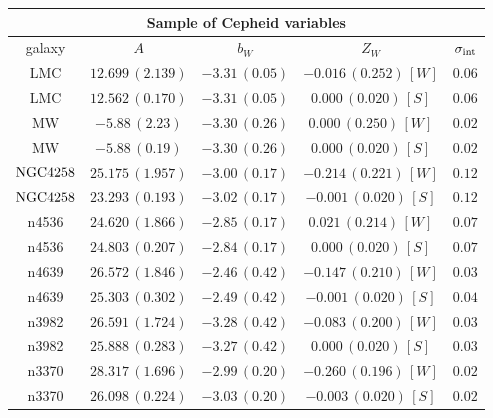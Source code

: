 \begin{table}[tbp]
\centering
\begin{tabular}{@{}ccccc}
\hline
\multicolumn{5}{c}{Sample of Cepheid variables} \\
\hline
galaxy & $A$ & $b_W$ & $Z_W$ & $\sigma_{\mathrm{int}}$ \\
\hline
 LMC & $12.699\,(2.139)$ & $-3.31\,(0.05)$ & $-0.016\,(0.252)\,[W]$ & $0.06$ \\

LMC & $12.562\,(0.170)$ & $-3.31\,(0.05)$ & $0.000\,(0.020)\,[S]$ & $0.06$ \\
  
 MW & $-5.88\,(2.23)$ & $-3.30\,(0.26)$ & $0.000\,(0.250)\,[W]$ & $0.02$ \\

 MW & $-5.88\,(0.19)$ & $-3.30\,(0.26)$ & $0.000\,(0.020)\,[S]$ & $0.02$ \\
 
 $\mathrm{NGC4258}$ & $25.175\,(1.957)$ & $-3.00\,(0.17)$ & $-0.214\,(0.221)\,[W]$& $0.12$ \\

 $\mathrm{NGC4258}$ & $23.293\,(0.193)$ & $-3.02\,(0.17)$ & $-0.001\,(0.020)\,[S]$& $0.12$ \\
 
 n4536 & $24.620\,(1.866)$ & $-2.85\,(0.17)$ & $ 0.021\,(0.214)\,[W]$ & $0.07$ \\

 n4536 & $24.803\,(0.207)$ & $-2.84\,(0.17)$ & $ 0.000\,(0.020)\,[S]$ & $0.07$ \\
 
 n4639 & $26.572\,(1.846)$ & $-2.46\,(0.42)$ & $-0.147\,(0.210)\,[W]$ & $0.03$ \\
 
 n4639 & $25.303\,(0.302)$ & $-2.49\,(0.42)$ & $-0.001\,(0.020)\,[S]$ & $0.04$ \\
  
 n3982 & $26.591\,(1.724)$ & $-3.28\,(0.42)$ & $-0.083\,(0.200)\,[W]$ & $0.03$ \\
  
 n3982 & $25.888\,(0.283)$ & $-3.27\,(0.42)$ & $ 0.000\,(0.020)\,[S]$ & $0.03$ \\
   
 n3370 & $28.317\,(1.696)$ & $-2.99\,(0.20)$ & $-0.260\,(0.196)\,[W]$ & $0.02$ \\
 
 n3370 & $26.098\,(0.224)$ & $-3.03\,(0.20)$ & $-0.003\,(0.020)\,[S]$ & $0.02$ \\
  

\end{tabular}
\end{table}
